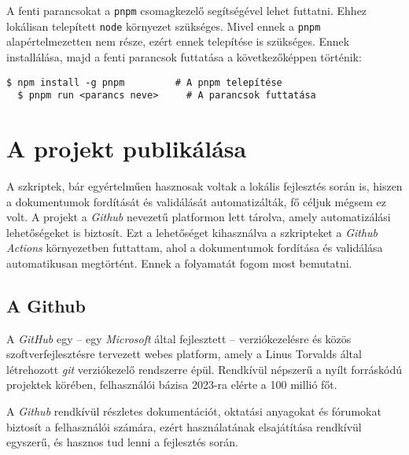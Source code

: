A fenti parancsokat a \texttt{pnpm} csomagkezelő segítségével lehet futtatni.
Ehhez lokálisan telepített \texttt{node} környezet szükséges. Mivel ennek a
\texttt{pnpm} alapértelmezetten nem része, ezért ennek telepítése is szükséges.
Ennek installálása, majd a fenti parancsok futtatása a következőképpen történik:
\begin{lstlisting}[caption={A pnpm telepítése és a parancsok futtatása}]
  $ npm install -g pnpm         # A pnpm telepítése
  $ pnpm run <parancs neve>     # A parancsok futtatása
\end{lstlisting}

\section{A projekt publikálása}

A szkriptek, bár egyértelműen hasznosak voltak a lokális fejlesztés során is,
hiszen a dokumentumok fordítását és validálását automatizálták, fő céljuk
mégsem ez volt. A projekt a \textit{Github} nevezetű platformon lett tárolva,
amely automatizálási lehetőségeket is biztosít. Ezt a lehetőséget kihasználva
a szkripteket a \textit{Github Actions} környezetben futtattam, ahol
a dokumentumok fordítása és validálása automatikusan megtörtént. Ennek a
folyamatát fogom most bemutatni.


\subsection{A Github}

A \textit{GitHub} egy -- egy \textit{Microsoft} által fejlesztett --
verziókezelésre és közös szoftverfejlesztésre tervezett webes platform, amely
a Linus Torvalds által létrehozott \textit{git} verziókezelő rendszerre épül.
Rendkívül népszerű a nyílt forráskódú projektek körében, felhasználói bázisa
2023-ra elérte a 100 millió főt. \cite{github_user_count}

A \textit{Github} rendkívül részletes dokumentációt, oktatási anyagokat és
fórumokat biztosít a felhasználói számára, ezért használatának elsajátítása
rendkívül egyszerű, és hasznos tud lenni a fejlesztés során.
\cite{github_documentation}

